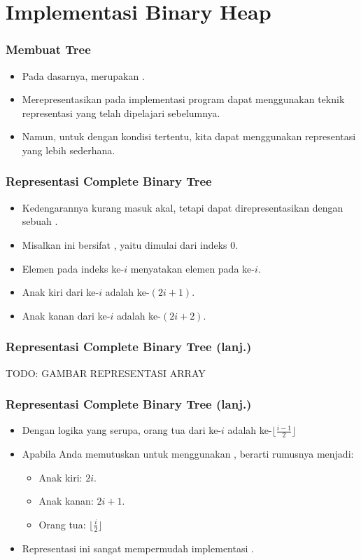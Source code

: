 \section{Implementasi Binary Heap}
\frame{\sectionpage}

\begin{frame}
\frametitle{Membuat Tree}
\begin{itemize}
  \item Pada dasarnya, \ftree merupakan \fgraph.
  \item Merepresentasikan \ftree pada implementasi program dapat menggunakan teknik representasi \fgraph yang telah dipelajari sebelumnya.
  \item Namun, untuk \ftree dengan kondisi tertentu, kita dapat menggunakan representasi yang lebih sederhana.
\end{itemize}
\end{frame}

\begin{frame}
\frametitle{Representasi Complete Binary Tree}
\begin{itemize}
  \item Kedengarannya kurang masuk akal, tetapi  dapat direpresentasikan dengan sebuah \farray.
  \item Misalkan \farray ini bersifat , yaitu dimulai dari indeks 0.
  \item Elemen pada indeks ke-$i$ menyatakan elemen pada \fnode ke-$i$.
  \item Anak kiri dari \fnode ke-$i$ adalah \fnode ke-$(2i+1)$. 
  \item Anak kanan dari \fnode ke-$i$ adalah \fnode ke-$(2i+2)$. 
\end{itemize}
\end{frame}

\begin{frame}
\frametitle{Representasi Complete Binary Tree (lanj.)}
TODO: GAMBAR REPRESENTASI ARRAY
\end{frame}

\begin{frame}
\frametitle{Representasi Complete Binary Tree (lanj.)}
\begin{itemize}
  \item Dengan logika yang serupa, orang tua dari \fnode ke-$i$ adalah \fnode ke-$\lfloor\frac{i-1}{2}\rfloor$
  \item Apabila Anda memutuskan untuk menggunakan , berarti rumusnya menjadi:
  \begin{itemize}
    \item Anak kiri: $2i$.
    \item Anak kanan: $2i+1$.
    \item Orang tua: $\lfloor \frac{i}{2} \rfloor$
  \end{itemize}
  \item Representasi ini sangat mempermudah implementasi \pbinaryHeap.
\end{itemize}
\end{frame}

